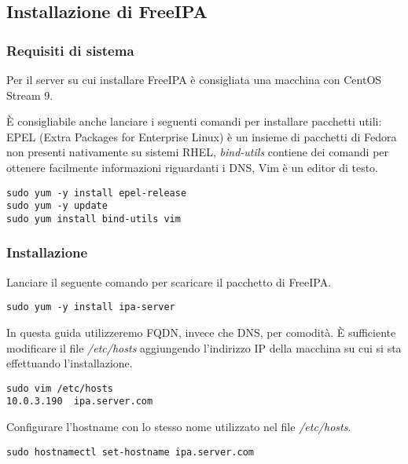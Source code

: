 \hypertarget{installazione-di-freeipa}{%
\subsection{Installazione di FreeIPA}\label{installazione-di-freeipa}}

\hypertarget{requisiti-di-sistema}{%
\subsubsection{Requisiti di sistema}\label{requisiti-di-sistema}}

Per il server su cui installare FreeIPA è consigliata una macchina con
CentOS Stream 9.

È consigliabile anche lanciare i seguenti comandi per installare
pacchetti utili: EPEL (Extra Packages for Enterprise Linux) è un insieme
di pacchetti di Fedora non presenti nativamente su sistemi RHEL,
\emph{bind-utils} contiene dei comandi per ottenere facilmente
informazioni riguardanti i DNS, Vim è un editor di testo.

\begin{verbatim}
sudo yum -y install epel-release
sudo yum -y update
sudo yum install bind-utils vim
\end{verbatim}

\hypertarget{installazione}{%
\subsubsection{Installazione}\label{installazione}}

Lanciare il seguente comando per scaricare il pacchetto di FreeIPA.

\begin{verbatim}
sudo yum -y install ipa-server
\end{verbatim}

In questa guida utilizzeremo FQDN, invece che DNS, per comodità. È
sufficiente modificare il file \emph{/etc/hosts} aggiungendo l'indirizzo
IP della macchina su cui si sta effettuando l'installazione.

\begin{verbatim}
sudo vim /etc/hosts
10.0.3.190  ipa.server.com
\end{verbatim}

Configurare l'hostname con lo stesso nome utilizzato nel file
\emph{/etc/hosts}.

\begin{verbatim}
sudo hostnamectl set-hostname ipa.server.com
\end{verbatim}

